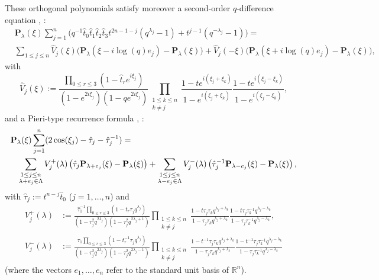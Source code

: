 \documentclass[reqno]{amsart}
\theoremstyle{remark}
\numberwithin{equation}{section}
\begin{document}
These orthogonal polynomials satisfy moreover a second-order $q$-difference equation
\cite[~5]{koo:askey-wilson}, \cite[~5.3, 4.4]{mac:affine}:
\begin{align}\label{qde}
&\mathbf{P}_\lambda (\xi ) \sum_{j=1}^n\bigl( q^{-1}\hat{t}_0 \hat{t}_1\hat{t}_2\hat{t}_3t^{2n-1-j}(q^{\lambda_j}-1)+t^{j-1}(q^{-\lambda_j}-1)\bigr)= \\
&\sum_{1\leq j\leq n}
\hat{V}_j(\xi) \bigl(  \mathbf{P}_{\lambda }(\xi-i\log (q) e_j )-\mathbf{P}_\lambda(\xi ) \bigr)
+
\hat{V}_j(-\xi) \bigl(  \mathbf{P}_{\lambda }(\xi+i\log (q) e_j)-\mathbf{P}_\lambda(\xi ) \bigr),\nonumber
\end{align}
with
\begin{equation*}
\hat{V}_{ j}(\xi):=
\frac{\prod_{0\leq r\leq 3} (1-\hat{t}_re^{i\xi_j}) }{(1-e^{2i\xi_j})  (1-q e^{2i\xi_j}) }
\prod_{\substack{1\leq k\leq n\\k\neq j}} \frac{1-te^{i(\xi_j+\xi_k)}}{1-e^{i(\xi_j+\xi_k)}}
\frac{1-te^{i(\xi_j-\xi_k)}}{1-e^{i(\xi_j-\xi_k)}} ,
\end{equation*}
and a Pieri-type recurrence formula  \cite[~6]{die:properties}, \cite[~5.3, 4.4]{mac:affine}:
\begin{eqnarray}\label{pieri}
\lefteqn{\mathbf{P}_\lambda (\xi ) \sum_{j=1}^n (2\cos (\xi_j)-\hat{\tau}_j-\hat{\tau}_j^{-1})=} &&\\
&&\sum_{\substack{1\leq j\leq n\\ \lambda +e_j\in\Lambda}}
V_j^+(\lambda) \left( \hat{\tau}_j \mathbf{P}_{\lambda +e_j}(\xi )-\mathbf{P}_\lambda(\xi ) \right)
+\sum_{\substack{1\leq j\leq n\\ \lambda -e_j\in\Lambda}}
V_j^-(\lambda) \left(  \hat{\tau}_j^{-1} \mathbf{P}_{\lambda -e_j}(\xi )-\mathbf{P}_\lambda(\xi ) \right),\nonumber
\end{eqnarray}
with $\hat{\tau}_j:=t^{n-j}\hat{t}_0$ ($j=1,\ldots ,n$) and
\begin{align*}
V_j^+(\lambda) &:= \frac{\hat{\tau}_1^{-1}\prod_{0\leq r\leq 3}(1-t_r\tau_jq^{\lambda_j})}{(1-\tau_j^2q^{2\lambda_j})(1-\tau_j^2q^{2\lambda_j+1})}
\prod_{\substack{1\leq k\leq n\\ k\neq j}}
\frac{1-t\tau_j\tau_kq^{\lambda_j+\lambda_k}}{1-\tau_j\tau_kq^{\lambda_j+\lambda_k}}
\frac{1-t\tau_j\tau_k^{-1}q^{\lambda_j-\lambda_k}}{1-\tau_j\tau_k^{-1}q^{\lambda_j-\lambda_k}}
,\\
V_j^-(\lambda) &:= 
 \frac{\hat{\tau}_1\prod_{0\leq r\leq 3}(1-t_r^{-1}\tau_jq^{\lambda_j})}{(1-\tau_j^2q^{2\lambda_j})(1-\tau_j^2q^{2\lambda_j-1})}
\prod_{\substack{1\leq k\leq n\\k\neq j}}
\frac{1-t^{-1}\tau_j\tau_kq^{\lambda_j+\lambda_k}}{1-\tau_j\tau_kq^{\lambda_j+\lambda_k}}
\frac{1-t^{-1}\tau_j\tau_k^{-1}q^{\lambda_j-\lambda_k}}{1-\tau_j\tau_k^{-1}q^{\lambda_j-\lambda_k}} 
\end{align*}
(where the vectors $e_1,\ldots ,e_n$ refer to the standard unit basis of $\mathbb{R}^n$). 
\end{document}
